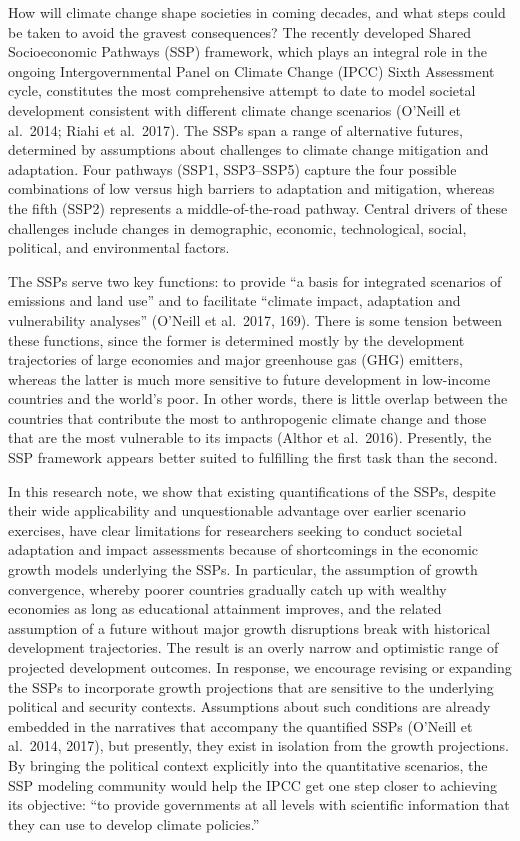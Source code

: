 \documentclass[
]{book}
\begin{document}
How will climate change shape societies in coming decades, and what steps could be taken to avoid the gravest consequences? The recently developed Shared Socioeconomic Pathways (SSP) framework, which plays an integral role in the ongoing Intergovernmental Panel on Climate Change (IPCC) Sixth Assessment cycle, constitutes the most comprehensive attempt to date to model societal development consistent with different climate change scenarios (O'Neill et al.~2014; Riahi et al.~2017). The SSPs span a range of alternative futures, determined by assumptions about challenges to climate change mitigation and adaptation. Four pathways (SSP1, SSP3--SSP5) capture the four possible combinations of low versus high barriers to adaptation and mitigation, whereas the fifth (SSP2) represents a middle-of-the-road pathway. Central drivers of these challenges include changes in demographic, economic, technological, social, political, and environmental factors.

The SSPs serve two key functions: to provide ``a basis for integrated scenarios of emissions and land use'' and to facilitate ``climate impact, adaptation and vulnerability analyses'' (O'Neill et al.~2017, 169). There is some tension between these functions, since the former is determined mostly by the development trajectories of large economies and major greenhouse gas (GHG) emitters, whereas the latter is much more sensitive to future development in low-income countries and the world's poor. In other words, there is little overlap between the countries that contribute the most to anthropogenic climate change and those that are the most vulnerable to its impacts (Althor et al.~2016). Presently, the SSP framework appears better suited to fulfilling the first task than the second.

In this research note, we show that existing quantifications of the SSPs, despite their wide applicability and unquestionable advantage over earlier scenario exercises, have clear limitations for researchers seeking to conduct societal adaptation and impact assessments because of shortcomings in the economic growth models underlying the SSPs. In particular, the assumption of growth convergence, whereby poorer countries gradually catch up with wealthy economies as long as educational attainment improves, and the related assumption of a future without major growth disruptions break with historical development trajectories. The result is an overly narrow and optimistic range of projected development outcomes. In response, we encourage revising or expanding the SSPs to incorporate growth projections that are sensitive to the underlying political and security contexts. Assumptions about such conditions are already embedded in the narratives that accompany the quantified SSPs (O'Neill et al.~2014, 2017), but presently, they exist in isolation from the growth projections. By bringing the political context explicitly into the quantitative scenarios, the SSP modeling community would help the IPCC get one step closer to achieving its objective: ``to provide governments at all levels with scientific information that they can use to develop climate policies.''
\end{document}
